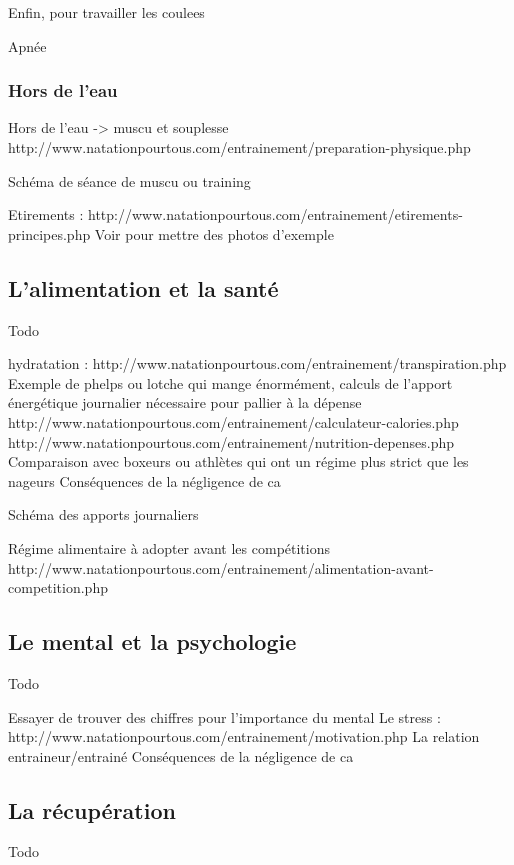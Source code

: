 Enfin, pour travailler les \gls{coulees}


Apnée


\subsubsection{Hors de l'eau}

Hors de l'eau -> muscu et souplesse
http://www.natationpourtous.com/entrainement/preparation-physique.php

Schéma de séance de muscu ou training

Etirements : http://www.natationpourtous.com/entrainement/etirements-principes.php
Voir pour mettre des photos d'exemple


\subsection{L’alimentation et la santé}

Todo

hydratation : http://www.natationpourtous.com/entrainement/transpiration.php
Exemple de phelps ou lotche qui mange énormément, calculs de l'apport énergétique journalier nécessaire pour pallier à la dépense
http://www.natationpourtous.com/entrainement/calculateur-calories.php
http://www.natationpourtous.com/entrainement/nutrition-depenses.php
Comparaison avec boxeurs ou athlètes qui ont un régime plus strict que les nageurs
Conséquences de la négligence de ca

Schéma des apports journaliers

Régime alimentaire à adopter avant les compétitions http://www.natationpourtous.com/entrainement/alimentation-avant-competition.php

\subsection{Le mental et la psychologie}

Todo

Essayer de trouver des chiffres pour l'importance du mental
Le stress : http://www.natationpourtous.com/entrainement/motivation.php
La relation entraineur/entrainé
Conséquences de la négligence de ca


\subsection{La récupération}\label{la recup}

Todo

